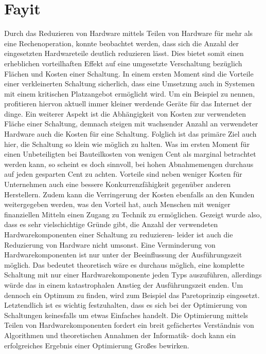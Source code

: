 \documentclass[conference]{IEEEtran}
\begin{document}
\section{Fayit}
Durch das Reduzieren von Hardware mittels Teilen
von Hardware für mehr als eine Rechenoperation, konnte
beobachtet werden, dass sich die Anzahl der eingesetzten
Hardwareteile deutlich reduzieren lässt. Dies bietet somit
einen erheblichen vorteilhaften Effekt auf eine umgesetzte
Verschaltung bezüglich Flächen und Kosten einer Schaltung.
In einem ersten Moment sind die Vorteile einer verkleinerten
Schaltung sicherlich, dass eine Umsetzung auch in Systemen
mit einem kritischen Platzangebot ermöglicht wird. Um ein
Beispiel zu nennen, profitieren hiervon aktuell immer kleiner
werdende Geräte für das Internet der dinge. Ein weiterer Aspekt
ist die Abhängigkeit von Kosten zur verwendeten Fläche
einer Schaltung, demnach steigen mit wachsender Anzahl an
verwendeter Hardware auch die Kosten für eine Schaltung.
Folglich ist das primäre Ziel auch hier, die Schaltung so
klein wie möglich zu halten. Was im ersten Moment für
einen Unbeteiligten bei Bauteilkosten von wenigen Cent als
marginal betrachtet werden kann, so scheint es doch sinnvoll,
bei hohen Abnahmemengen durchaus auf jeden gesparten
Cent zu achten. Vorteile sind neben weniger Kosten für Unternehmen
auch eine bessere Konkurrenzfähigkeit gegenüber
anderen Herstellern. Zudem kann die Verringerung der Kosten
ebenfalls an den Kunden weitergegeben werden, was den
Vorteil hat, auch Menschen mit weniger finanziellen Mitteln
einen Zugang zu Technik zu ermöglichen.
Gezeigt wurde also, dass es sehr vielschichtige Gründe gibt,
die Anzahl der verwendeten Hardwarekomponenten einer
Schaltung zu reduzieren- leider ist auch die Reduzierung
von Hardware nicht umsonst. Eine Verminderung von Hardwarekomponenten
ist nur unter der Beeinflussung der Ausführungszeit
möglich. Das bedeutet theoretisch wäre es durchaus
möglich, eine komplette Schaltung mit nur einer Hardwarekomponente
jeden Typs auszuführen, allerdings würde
das in einem katastrophalen Anstieg der Ausführungszeit
enden. Um dennoch ein Optimum zu finden, wird zum Beispiel
das Paretoprinzip eingesetzt.
Letztendlich ist es wichtig festzuhalten, dass es sich bei der
Optimierung von Schaltungen keinesfalls um etwas Einfaches
handelt. Die Optimierung mittels Teilen von Hardwarekomponenten
fordert ein breit gefächertes Verständnis von Algorithmen
und theoretischen Annahmen der Informatik- doch
kann ein erfolgreiches Ergebnis einer Optimierung Großes
bewirken.
\end{document}
